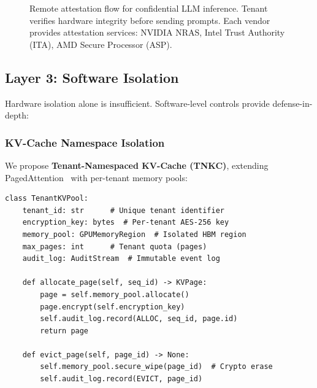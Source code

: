 \documentclass[conference,10pt]{IEEEtran}
\begin{document}
\begin{figure}[!htbp]
\centering
{}
\caption{Remote attestation flow for confidential LLM inference. Tenant verifies hardware integrity before sending prompts. Each vendor provides attestation services: NVIDIA NRAS, Intel Trust Authority (ITA), AMD Secure Processor (ASP).}
\label{fig:attest}
\end{figure}

\subsection{Layer 3: Software Isolation}

Hardware isolation alone is insufficient. Software-level controls provide defense-in-depth:

\subsubsection{KV-Cache Namespace Isolation}

We propose \textbf{Tenant-Namespaced KV-Cache (TNKC)}, extending PagedAttention~\cite{kwon2023vllm} with per-tenant memory pools:

\begin{lstlisting}
class TenantKVPool:
    tenant_id: str      # Unique tenant identifier
    encryption_key: bytes  # Per-tenant AES-256 key
    memory_pool: GPUMemoryRegion  # Isolated HBM region
    max_pages: int      # Tenant quota (pages)
    audit_log: AuditStream  # Immutable event log
    
    def allocate_page(self, seq_id) -> KVPage:
        page = self.memory_pool.allocate()
        page.encrypt(self.encryption_key)
        self.audit_log.record(ALLOC, seq_id, page.id)
        return page
    
    def evict_page(self, page_id) -> None:
        self.memory_pool.secure_wipe(page_id)  # Crypto erase
        self.audit_log.record(EVICT, page_id)
\end{lstlisting}
\end{document}
